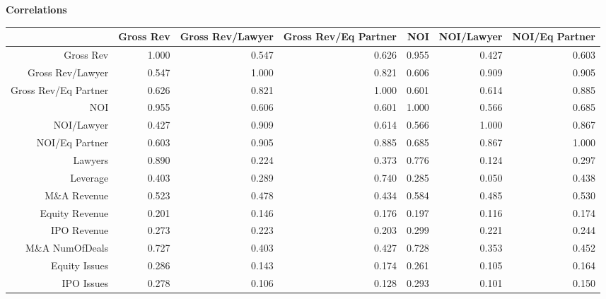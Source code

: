 \documentclass{article}
\begin{document}
\newpage
{\large \textbf{Correlations} }%
\begin{table}[H]
\centering
\begin{tabular}{rrrrrrr}
  \hline
 & Gross Rev & Gross Rev/Lawyer & Gross Rev/Eq Partner & NOI & NOI/Lawyer & NOI/Eq Partner \\ 
  \hline
Gross Rev & 1.000 & 0.547 & 0.626 & 0.955 & 0.427 & 0.603 \\ 
  Gross Rev/Lawyer & 0.547 & 1.000 & 0.821 & 0.606 & 0.909 & 0.905 \\ 
  Gross Rev/Eq Partner & 0.626 & 0.821 & 1.000 & 0.601 & 0.614 & 0.885 \\ 
  NOI & 0.955 & 0.606 & 0.601 & 1.000 & 0.566 & 0.685 \\ 
  NOI/Lawyer & 0.427 & 0.909 & 0.614 & 0.566 & 1.000 & 0.867 \\ 
  NOI/Eq Partner & 0.603 & 0.905 & 0.885 & 0.685 & 0.867 & 1.000 \\ 
  Lawyers & 0.890 & 0.224 & 0.373 & 0.776 & 0.124 & 0.297 \\ 
  Leverage & 0.403 & 0.289 & 0.740 & 0.285 & 0.050 & 0.438 \\ 
  M\&A Revenue & 0.523 & 0.478 & 0.434 & 0.584 & 0.485 & 0.530 \\ 
  Equity Revenue & 0.201 & 0.146 & 0.176 & 0.197 & 0.116 & 0.174 \\ 
  IPO Revenue & 0.273 & 0.223 & 0.203 & 0.299 & 0.221 & 0.244 \\ 
  M\&A NumOfDeals & 0.727 & 0.403 & 0.427 & 0.728 & 0.353 & 0.452 \\ 
  Equity Issues & 0.286 & 0.143 & 0.174 & 0.261 & 0.105 & 0.164 \\ 
  IPO Issues & 0.278 & 0.106 & 0.128 & 0.293 & 0.101 & 0.150 \\ 
   \hline
\end{tabular}
\end{table}
\end{document}
